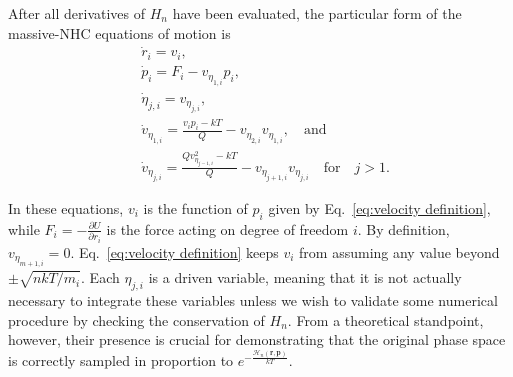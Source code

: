\documentclass[
aip,
jcp,
reprint,
]{revtex4-1}
\newcommand{\vt}[1]{\boldsymbol{\mathbf{#1}}}          %
\newcommand{\diff}[2]{\frac{\partial #2}{\partial #1}} %
\newcommand{\nn}{n}
\begin{document}
After all derivatives of $H_n$ have been evaluated, the particular form of the massive-NHC equations of motion is
\begin{subequations}
	\label{eq:NHC equations}
	\begin{align}
	&\dot{r}_i = v_i, \\
	&\dot{p}_i = F_i - v_{\eta_{1,i}} p_i, \label{eq:NHC equations p} \\
	&\dot{\eta}_{j,i} = v_{\eta_{j,i}}, \\
	&\dot{v}_{\eta_{1, i}} = \frac{v_i p_i - kT}{Q} - v_{\eta_{2, i}} v_{\eta_{1, i}}, \quad \mathrm{and}  \label{eq:NHC equations v_eta_1} \\
	&\dot{v}_{\eta_{j, i}} = \frac{Q v_{\eta_{j-1, i}}^2 - kT}{Q} - v_{\eta_{j+1, i}} v_{\eta_{j, i}} \quad \mathrm{for} \quad j > 1.
	\end{align}
\end{subequations}

In these equations, $v_i$ is the function of $p_i$ given by Eq.~\eqref{eq:velocity definition},
while $F_i = -\diff{r_i}{U}$ is the force acting on degree of freedom $i$.
By definition, $v_{\eta_{m+1, i}} = 0$.
Eq.~\eqref{eq:velocity definition} keeps $v_i$ from assuming any value beyond $\pm \sqrt{{\nn kT}/{m_i}}$.
Each $\eta_{j, i}$ is a driven variable, meaning that it is not actually necessary to integrate these variables unless we wish to validate some numerical procedure by checking the conservation of $H_n$.
From a theoretical standpoint, however, their presence is crucial for demonstrating that the original phase space is correctly sampled in proportion to $e^{-\frac{\mathcal{H}_n(\vt r, \vt p)}{kT}}$.
\end{document}
